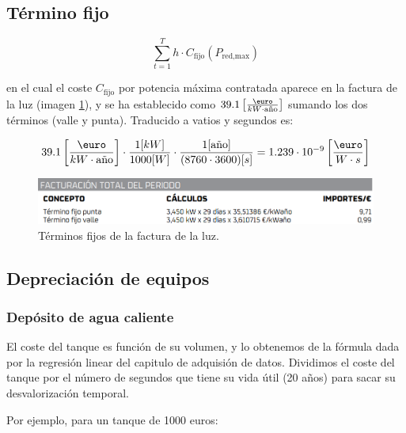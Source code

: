 \subsection{Término fijo}

\begin{equation}
	\sum_{t=1}^{T} h \cdot C_\text{fijo}(P_\text{red,max})
\end{equation}

en el cual el coste $C_{\text{fijo}}$ por potencia máxima contratada aparece en la factura de la
luz (imagen \ref{fig:fixed_energy_cost}), y se ha establecido como $39.1 \left[\frac{\text{\euro}}{kW\cdot \text{\text{año}}}\right]$
sumando los dos términos (valle y punta).
Traducido a vatios y segundos es:

\begin{equation}
	39.1 \left[\frac{\text{\euro}}{kW\cdot \text{año}}\right] \cdot \frac{1[kW]}{1000[W]} \cdot \frac{1[\text{año}]}{(8760 \cdot 3600)[s]} = 1.239 \cdot 10^{-9} \left[\frac{\text{\euro}}{W\cdot s}\right]
\end{equation}



\begin{figure}[h] \centering
	\centering
	\includegraphics[width=1\textwidth]{./capitulos/resultados_discusion/images/fixed_energy_cost.png}
	\caption{Términos fijos de la factura de la luz.}
	\label{fig:fixed_energy_cost}
\end{figure}


\subsection{Depreciación de equipos}

\subsubsection{Depósito de agua caliente}

El coste del tanque es función de su volumen, y lo obtenemos de la fórmula dada
por la regresión linear del capitulo de adquisión de datos. Dividimos el coste
del tanque por el número de segundos que tiene su vida útil (20 años) para
sacar su desvalorización temporal.

Por ejemplo, para un tanque de 1000 euros:

